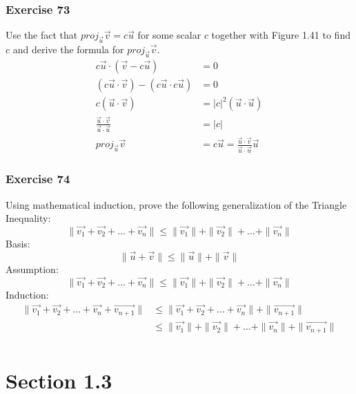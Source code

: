 \documentclass[letterpaper, 12pt]{math}
\begin{document}
\subsubsection*{Exercise 73}
Use the fact that \( proj_{\vec{u}}\vec{v} = c\vec{u} \) for some scalar \( c \)
together with Figure 1.41 to find \( c \) and derive the formula for
\( proj_{\vec{u}}\vec{v} \).
\begin{align*}
  c\vec{u}\cdot(\vec{v}-c\vec{u}) &= 0 \\
  (c\vec{u}\cdot\vec{v})-(c\vec{u}\cdot c\vec{u}) &= 0 \\
  c(\vec{u}\cdot\vec{v}) &= |c|^2(\vec{u}\cdot\vec{u}) \\
  \frac{\vec{u}\cdot\vec{v}}{\vec{u}\cdot\vec{u}} &= |c| \\
  proj_{\vec{u}}\vec{v} &= c\vec{u} =
    \frac{\vec{u}\cdot\vec{v}}{\vec{u}\cdot\vec{u}}\vec{u}
\end{align*}

\subsubsection*{Exercise 74}
Using mathematical induction, prove the following generalization of the
Triangle Inequality:
\[ \|\vec{v_1}+\vec{v_2}+\dots+\vec{v_n}\| \le
  \|\vec{v_1}\|+\|\vec{v_2}\|+\dots+\|\vec{v_n}\| \]
Basis:
\[ \|\vec{u}+\vec{v}\| \le \|\vec{u}\|+\|\vec{v}\| \]
Assumption:
\[ \|\vec{v_1}+\vec{v_2}+\dots+\vec{v_n}\| \le
  \|\vec{v_1}\|+\|\vec{v_2}\|+\dots+\|\vec{v_n}\| \]
Induction:
\begin{align*}
  \|\vec{v_1}+\vec{v_2}+\dots+\vec{v_n}+\vec{v_{n+1}}\| &\le
    \|\vec{v_1}+\vec{v_2}+\dots+\vec{v_n}\|+\|\vec{v_{n+1}}\| \\
  &\le \|\vec{v_1}\|+\|\vec{v_2}\|+\dots+\|\vec{v_n}\|+\|\vec{v_{n+1}}\| \\
\end{align*}

\section*{Section 1.3}
\end{document}
